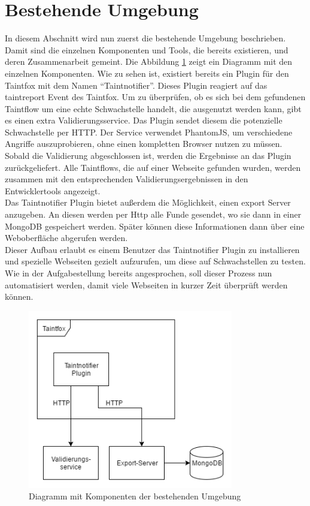 \section{Bestehende Umgebung}
In diesem Abschnitt wird nun zuerst die bestehende Umgebung beschrieben. Damit sind die einzelnen Komponenten und Tools, die bereits existieren, und deren Zusammenarbeit gemeint. Die Abbildung \ref{fig:BestehendeUmgebung} zeigt ein Diagramm mit den einzelnen Komponenten. Wie zu sehen ist, existiert bereits ein Plugin für den Taintfox mit dem Namen \enquote{Taintnotifier}. Dieses Plugin reagiert auf das taintreport Event des Taintfox. Um zu überprüfen, ob es sich bei dem gefundenen Taintflow um eine echte Schwachstelle handelt, die ausgenutzt werden kann, gibt es einen extra Validierungsservice. Das Plugin sendet diesem die potenzielle Schwachstelle per HTTP. Der Service verwendet PhantomJS, um verschiedene Angriffe auszuprobieren, ohne einen kompletten Browser nutzen zu müssen. Sobald die Validierung abgeschlossen ist, werden die Ergebnisse an das Plugin zurückgeliefert. Alle Taintflows, die auf einer Webseite gefunden wurden, werden zusammen mit den entsprechenden Validierungsergebnissen in den Entwicklertools angezeigt. \\
Das Taintnotifier Plugin bietet außerdem die Möglichkeit, einen export Server anzugeben. An diesen werden per Http alle Funde gesendet, wo sie dann in einer MongoDB gespeichert werden. Später können diese Informationen dann über eine Weboberfläche abgerufen werden. \\
Dieser Aufbau erlaubt es einem Benutzer das Taintnotifier Plugin zu installieren und spezielle Webseiten gezielt aufzurufen, um diese auf Schwachstellen zu testen. Wie in der Aufgabestellung bereits angesprochen, soll dieser Prozess nun automatisiert werden, damit viele Webseiten in kurzer Zeit überprüft werden können.

\begin{figure}[H]
	\centering
		\includegraphics[width=0.8\textwidth]{Bilder/AlteUmgebung.png}
	\caption{Diagramm mit Komponenten der bestehenden Umgebung}
	\label{fig:BestehendeUmgebung}
\end{figure}

